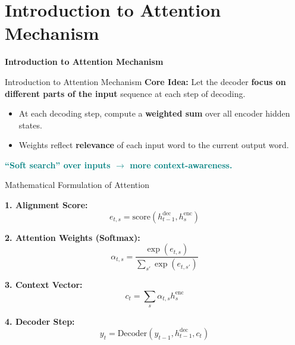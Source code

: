 \section{Introduction to Attention Mechanism}
\begin{frame}{}
  \LARGE \textbf{Introduction to Attention Mechanism}
\end{frame}

\begin{frame}{Introduction to Attention Mechanism}
  \textbf{Core Idea:} Let the decoder \textbf{focus on different parts of the input} sequence at each step of decoding.
  \vspace{1em}
  \begin{itemize}
    \item[\textcolor{red}{$\blacktriangleright$}] At each decoding step, compute a \textbf{weighted sum} over all encoder hidden states.
    \item[\textcolor{red}{$\blacktriangleright$}] Weights reflect \textbf{relevance} of each input word to the current output word.
  \end{itemize}
  \vspace{1em}
  \textcolor{teal}{\textbf{``Soft search'' over inputs $\rightarrow$ more context-awareness.}}
\end{frame}

\begin{frame}{Mathematical Formulation of Attention}
  \begin{flushleft}
    \textbf{1. Alignment Score:}
    \begin{equation*}
      e_{t,s} = \text{score}(h_{t-1}^{\text{dec}}, h_s^{\text{enc}})
    \end{equation*}

    \textbf{2. Attention Weights (Softmax):}
    \begin{equation*}
      \alpha_{t, s} = \frac{\exp(e_{t, s})}{\sum_{s'} \exp(e_{t, s'})}
    \end{equation*}

    \textbf{3. Context Vector:}
    \begin{equation*}
      c_t = \sum_s \alpha_{t, s} h_s^{\text{enc}}
    \end{equation*}

    \textbf{4. Decoder Step:}
    \begin{equation*}
      y_t = \text{Decoder}(y_{t-1}, h_{t-1}^{\text{dec}}, c_t)
    \end{equation*}
  \end{flushleft}
\end{frame}

